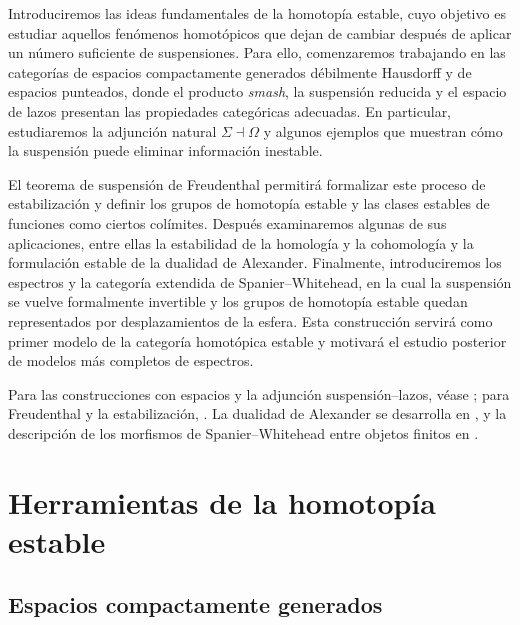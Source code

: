 Introduciremos las ideas fundamentales de la homotopía estable, cuyo objetivo es estudiar aquellos fenómenos homotópicos que dejan de cambiar después de aplicar un número suficiente de suspensiones. Para ello, comenzaremos trabajando en las categorías de espacios compactamente generados débilmente Hausdorff y de espacios punteados, donde el producto \emph{smash}, la suspensión reducida y el espacio de lazos presentan las propiedades categóricas adecuadas. En particular, estudiaremos la adjunción natural \(\Sigma\dashv\Omega\) y algunos ejemplos que muestran cómo la suspensión puede eliminar información inestable.

El teorema de suspensión de Freudenthal permitirá formalizar este proceso de estabilización y definir los grupos de homotopía estable y las clases estables de funciones como ciertos colímites. Después examinaremos algunas de sus aplicaciones, entre ellas la estabilidad de la homología y la cohomología y la formulación estable de la dualidad de Alexander. Finalmente, introduciremos los espectros y la categoría extendida de Spanier--Whitehead, en la cual la suspensión se vuelve formalmente invertible y los grupos de homotopía estable quedan representados por desplazamientos de la esfera. Esta construcción servirá como primer modelo de la categoría homotópica estable y motivará el estudio posterior de modelos más completos de espectros.


Para las construcciones con espacios y la adjunción suspensión--lazos, véase \cite[\S\S1--2 y 4--5, especialmente proposición~5.7]{strickland_cgwh}; para Freudenthal y la estabilización, \cite[cap.~11, \S\S1--3]{may1999}. La dualidad de Alexander se desarrolla en \cite[\S3.3, corolario~3.45]{hatcher2002}, y la descripción de los morfismos de Spanier--Whitehead entre objetos finitos en \cite[corolario~3.2.2.2 y \S4.2.2]{malkiewich}.

\section{Herramientas de la homotopía estable}

\subsection{Espacios compactamente generados}

